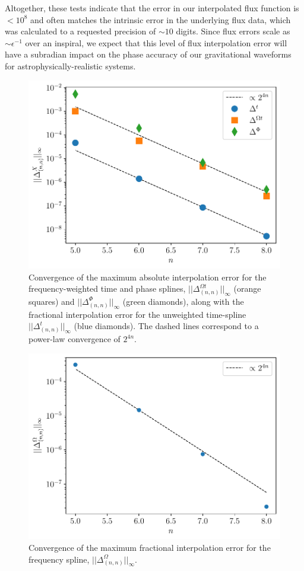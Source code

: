 \documentclass[%
 reprint,
 nofootinbib,
 amsmath,amssymb,
 aps,
 prd,
]{revtex4-2}
\begin{document}
Altogether, these tests indicate that the error in our interpolated flux function is $< 10^{8}$ and often matches the intrinsic error in the underlying flux data, which was calculated to a requested precision of $\sim 10$ digits. Since flux errors scale as $\sim \epsilon^{-1}$ over an inspiral, we expect that this level of flux interpolation error will have a subradian impact on the phase accuracy of our gravitational waveforms for astrophysically-realistic systems.

\begin{figure}[!t]
    \centering
    \includegraphics[width=0.95\linewidth]{figures/timeAndPhaseConvergence.pdf}
    \caption{Convergence of the maximum absolute interpolation error for the frequency-weighted time and phase splines, $||\Delta^{\Omega t}_{(n,n)}||_\infty$ (orange squares) and $||\Delta^\Phi_{(n,n)}||_\infty$ (green diamonds), along with the fractional interpolation error for the unweighted time-spline $||\Delta^t_{(n,n)}||_\infty$ (blue diamonds). The dashed lines correspond to a power-law convergence of $2^{4n}$.}
    \label{fig:trajConvergence}
\end{figure}

\begin{figure}[!t]
    \centering
    \includegraphics[width=0.95\linewidth]{figures/frequencyConvergence.pdf}
    \caption{Convergence of the maximum fractional interpolation error for the frequency spline, $||\Delta^{\Omega}_{(n,n)}||_\infty$.}
    \label{fig:frequencyConvergence}
\end{figure}
\end{document}
